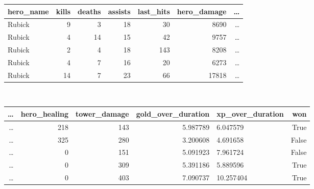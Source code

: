 \documentclass[a4paper,12pt,openany,oneside]{book}
\begin{document}
\begin{table}[ht]
	\scriptsize	
	\centering	
	\begin{tabularx}{0.6\textwidth}{lrrrrrr}
		hero\_name & kills & deaths & assists & last\_hits & hero\_damage & \dots \\
		\midrule
		Rubick &     9 &      3 &      18 &        30 &        8690 & \dots \\      
		Rubick &     4 &     14 &      15 &        42 &        9757 & \dots \\      
		Rubick &     2 &      4 &      18 &       143 &        8208 & \dots \\      
		Rubick &     4 &      7 &      16 &        20 &        6273 & \dots \\      
		Rubick &    14 &      7 &      23 &        66 &       17818 & \dots \\ 
	\end{tabularx}
	\\[3.0em]
	\centering
	\begin{tabularx}{0.72\textwidth}{rrrrlr}
		\dots & hero\_healing & tower\_damage & gold\_over\_duration & xp\_over\_duration &   won \\
		\midrule
		\dots & 218 &          143 &           5.987789 &         6.047579 &  True \\
		\dots & 325 &          280 &           3.200608 &         4.691658 & False \\
		\dots & 0 &          151 &           5.091923 &         7.961724 & False \\
		\dots & 0 &          309 &           5.391186 &         5.889596 &  True \\
		\dots & 0 &          403 &           7.090737 &        10.257404 &  True \\
	\end{tabularx}
	\label{table:matches_final}
\end{table}
\end{document}
